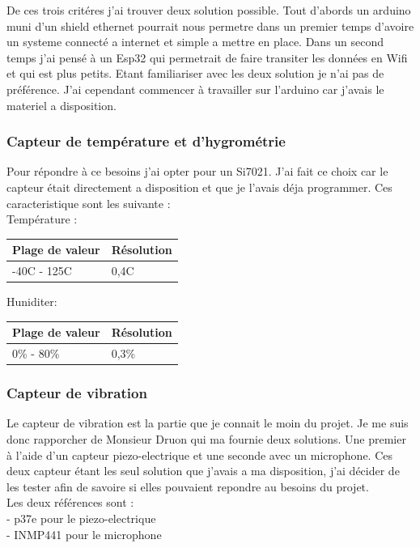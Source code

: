 \documentclass[5pt]{article}
\begin{document}
De ces trois critéres j'ai trouver deux solution possible. 
Tout d'abords un arduino muni d'un shield ethernet pourrait nous permetre dans un premier temps d'avoire un systeme 
connecté a internet et simple a mettre en place.
Dans un second temps j'ai pensé à un Esp32 qui permetrait de faire transiter les données en Wifi et qui est plus petits. 
Etant familiariser avec les deux solution je n'ai pas de préférence. J'ai cependant commencer à travailler sur l'arduino car j'avais
le materiel a disposition.

\subsubsection{Capteur de température et d'hygrométrie }
Pour répondre à ce besoins j'ai opter pour un Si7021. J'ai fait ce choix car le capteur était directement a disposition et que je l'avais déja programmer. Ces caracteristique sont les suivante :\\
Température :\\
\begin{center}
    \begin{tabular}{|l|l|}
	\hline
	    Plage de valeur & Résolution \\
	\hline
	    -40C - 125C & 0,4C \\
	\hline
    \end{tabular}
\end{center}


Huniditer:\\
\begin{center}
    \begin{tabular}{|l|l|}
	\hline
	    Plage de valeur & Résolution \\
	\hline
	    0\% - 80\% & 0,3\% \\
	\hline
    \end{tabular}
\end{center}

\subsubsection{Capteur de vibration}
Le capteur de vibration est la partie que je connait le moin du projet. Je me suis donc rapporcher de Monsieur Druon qui ma fournie deux solutions.
 Une premier à l'aide d'un capteur piezo-electrique et une seconde avec un  microphone. Ces deux capteur étant les seul solution que j'avais a ma disposition, 
 j'ai décider de les tester afin de savoire si elles pouvaient repondre au besoins du projet.\\
Les deux références sont :\\
- p37e pour le piezo-electrique\\
- INMP441 pour le microphone\\
\end{document}
